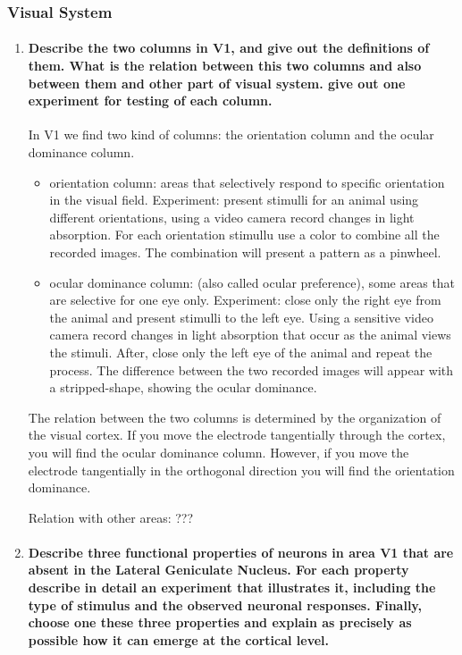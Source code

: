 \documentclass[12pt,article,oneside,a4paper]{memoir}
\begin{document}
\subsubsection{Visual System}
\begin{enumerate}
\item \paragraph{Describe the two columns in V1, and give out the definitions of them. What is the relation between this two columns and also between them and other part of visual system. give out one experiment for testing of each column.}
In V1 we find two kind of columns: the orientation column and the ocular dominance column.
\begin{itemize}
\item orientation column: areas that selectively respond to specific orientation in the visual field. Experiment: present stimulli for an animal using different orientations, using a video camera record changes in light absorption. For each orientation stimullu use a color to combine all the recorded images. The combination will present a pattern as a pinwheel.
\item ocular dominance column: (also called ocular preference), some areas that are selective for one eye only. Experiment: close only the right eye from the animal and present stimulli to the left eye. Using a sensitive video camera record changes in light absorption that occur as the animal views the stimuli. After, close only the left eye of the animal and repeat the process. The difference between the two recorded images will appear with a stripped-shape, showing the ocular dominance.
\end{itemize}

The relation between the two columns is determined by the organization of the visual cortex. If you move the electrode tangentially through the cortex, you will find the ocular dominance column. However, if you move the electrode tangentially in the orthogonal direction you will find the orientation dominance.

Relation with other areas: ???

\item \paragraph{Describe three functional properties of neurons in area V1 that are absent in the Lateral Geniculate Nucleus. For each property describe in detail an experiment that illustrates it, including the type of stimulus and the observed neuronal responses. Finally, choose one these three properties and explain as precisely as possible how it can emerge at the cortical level.}


\end{enumerate}
\end{document}
